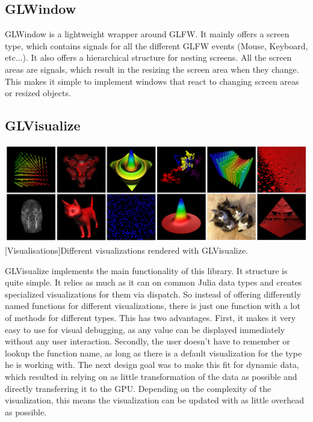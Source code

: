 \subsection{GLWindow}
GLWindow is a lightweight wrapper around GLFW.
It mainly offers a screen type, which contains signals for all the different GLFW events (Mouse, Keyboard, etc...). 
It also offers a hierarchical structure for nesting screens. 
All the screen areas are signals, which result in the resizing the screen area when they change. 
This makes it simple to implement windows that react to changing screen areas or resized objects.


\subsection{GLVisualize}

\vspace{1em}
\begin{minipage}{\linewidth}
    \centering
    \includegraphics[width=0.9\linewidth]{graphics/glvisualize.jpg}
    [Visualisations]{Different visualizations rendered with GLVisualize.}
    \label{fig:glvisualize}
\end{minipage}

GLVisualize implements the main functionality of this library.
It structure is quite simple. 
It relies as much as it can on common Julia data types and creates specialized visualizations for them via dispatch.
So instead of offering differently named functions for different visualizations, there is just one function with a lot of methods for different types.
This has two advantages.
First, it makes it very easy to use for visual debugging, as any value can be displayed immediately without any user interaction.
Secondly, the user doesn't have to remember or lookup the function name, as long as there is a default visualization for the type he is working with.
The next design goal was to make this fit for dynamic data, which resulted in relying on as little transformation of the data as possible and directly transferring it to the GPU.
Depending on the complexity of the visualization, this means the visualization can be updated with as little overhead as possible.


